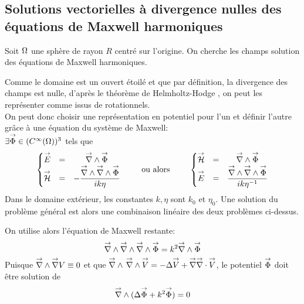 \subsection{Solutions vectorielles à divergence nulles des équations de Maxwell harmoniques}
\label{sec:sol_maxwell}


Soit \(\Omega\) une sphère de rayon \(R\) centré sur l'origine. On cherche les champs solution des équations de Maxwell harmoniques.

Comme le domaine est un ouvert étoilé et que par définition, la divergence des champs est nulle, d'après le théorème de Helmholtz-Hodge \cite{gui_rigorous_2007}, on peut les représenter comme issus de rotationnels.\\
On peut donc choisir une représentation en potentiel pour l'un et définir l'autre grâce à une équation du système de Maxwell:\\
 \(\exists {\overset{\rightarrow}{\Phi}} \in (C^\infty(\Omega))^3\) tels que
\begin{equation}
  \label{eq:sol_maxwell:pot_hertz}
  \left\lbrace\begin{matrix}
    \vE &=& \vrot \vect \Phi \\
    \vH &=& - \frac{\vrot \vrot \vect \Phi}{ik\eta}
  \end{matrix} \right.
  \qquad \text{ ou alors } \qquad
  \left\lbrace\begin{matrix}
    \vH &=& \vrot \vect \Phi\\
    \vE &=& \frac{\vrot \vrot \vect \Phi}{ik\eta^{-1}}\\
  \end{matrix}\right.
\end{equation}
Dans le domaine extérieur, les constantes \(k,\eta\) sont \(k_0\) et \(\eta_0\).
Une solution du problème général est alors une combinaison linéaire des deux problèmes ci-dessus.

On utilise alors l'équation de Maxwell restante:
\[
    {\overset{\rightarrow}{\nabla}}\wedge {\overset{\rightarrow}{\nabla}}\wedge {\overset{\rightarrow}{\nabla}}\wedge {\overset{\rightarrow}{\Phi}} = k^2 {\overset{\rightarrow}{\nabla}}\wedge {\overset{\rightarrow}{\Phi}}
\]
Puisque \({\overset{\rightarrow}{\nabla}}\wedge  {\overset{\rightarrow}{\nabla}}  V  \equiv 0\) et que \({\overset{\rightarrow}{\nabla}}\wedge\, {\overset{\rightarrow}{\nabla}}\wedge {\overset{\rightarrow}{V}} = -\Delta {\overset{\rightarrow}{V}} + {\overset{\rightarrow}{\nabla}} {\overset{\rightarrow}{\nabla}}\cdot {\overset{\rightarrow}{V}}\), le potentiel \({\overset{\rightarrow}{\Phi}}\) doit être solution de
\begin{equation}
  \label{eq:sol_maxwell:helmholtz_vect}
  \vrot ( \lapl \vect \Phi + k^2 \vect \Phi ) = 0
\end{equation}

